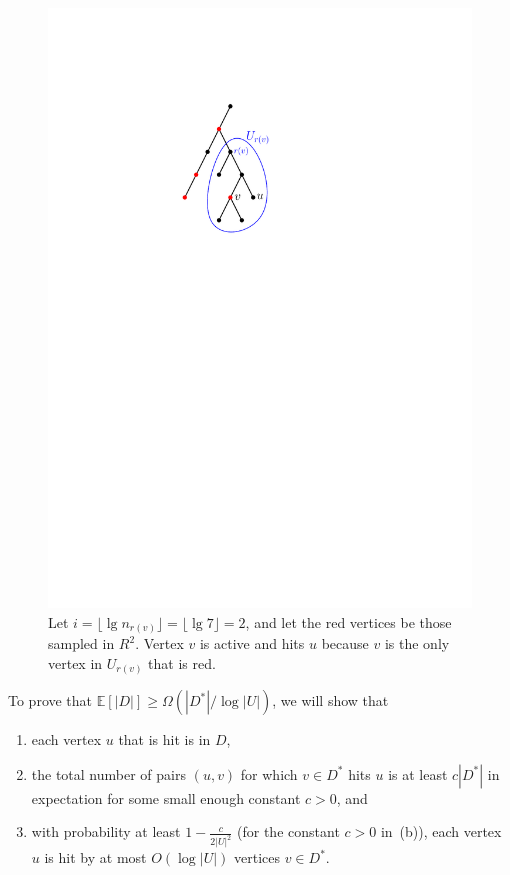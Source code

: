 \documentclass{article}
\newcommand{\f}{\frac}
\newcommand{\BE}{\begin{enumerate}}
\newcommand{\EE}{\end{enumerate}}
\newcommand{\im}{\item}
\newcommand{\Om}{\Omega}
\newcommand{\lf}{\lfloor}
\newcommand{\rf}{\rfloor}
\newcommand{\E}{\mathbb E}
\newcommand{\1}{\mathbbm 1}
\newcommand{\alert}{\textcolor{red}}
\begin{document}

\begin{figure}\centering
\includegraphics[scale=1]{hits.pdf}
\caption{Let $i=\lf\lg n_{r(v)}\rf=\lf\lg 7\rf=2$, and let the red vertices be those sampled in $R^2$. Vertex $v$ is active and hits $u$ because $v$ is the only vertex in $U_{r(v)}$ that is red.}\label{fig:hits}
\end{figure}

To prove that $\E[|D|] \ge \Om(|D^*|/\log|U|)$, we will show that
 \BE
 \im[(a)] each vertex $u$ that is hit is in $D$, 
 \im[(b)] the total number of pairs $(u,v)$ for which $v\in D^*$ hits $u$ is at least $c |D^*|$ in expectation for some small enough constant $c>0$, and
 \im[(c)] with probability at least $1-\f c{2|U|^2}$ (for the constant $c>0$ in~(b)), each vertex $u$ is hit by at most $O(\log|U|)$ vertices $v\in D^*$. %
 \EE
\end{document}
